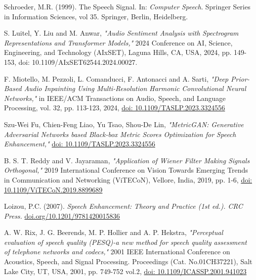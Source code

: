 \begin{thebibliography}{99}

   Schroeder, M.R. (1999). The Speech Signal. In: \textit{Computer Speech}. Springer Series in Information Sciences, vol 35. Springer, Berlin, Heidelberg.

    S. Luitel, Y. Liu and M. Anwar, \textit{"Audio Sentiment Analysis with Spectrogram Representations and Transformer Models,"} 2024 Conference on AI, Science, Engineering, and Technology (AIxSET), Laguna Hills, CA, USA, 2024, pp. 149-153, doi: 10.1109/AIxSET62544.2024.00027.

    F. Miotello, M. Pezzoli, L. Comanducci, F. Antonacci and A. Sarti, \textit{"Deep Prior-Based Audio Inpainting Using Multi-Resolution Harmonic Convolutional Neural Networks,"} in IEEE/ACM Transactions on Audio, Speech, and Language Processing, vol. 32, pp. 113-123, 2024, \href{https://ieeexplore.ieee.org/document/10286406}{doi: 10.1109/TASLP.2023.3324556}

    Szu-Wei Fu, Chien-Feng Liao, Yu Tsao, Shou-De Lin, \textit{"MetricGAN: Generative Adversarial Networks based Black-box Metric Scores Optimization for Speech Enhancement,"} \href{https://arxiv.org/abs/1905.04874}{doi: 10.1109/TASLP.2023.3324556}    
    
    B. S. T. Reddy and V. Jayaraman, \textit{"Application of Wiener Filter Making Signals Orthogonal,"} 2019 International Conference on Vision Towards Emerging Trends in Communication and Networking (ViTECoN), Vellore, India, 2019, pp. 1-6, \href{https://ieeexplore.ieee.org/document/8899689}{doi: 10.1109/ViTECoN.2019.8899689}

    
     Loizou, P.C. (2007). \textit{Speech Enhancement: Theory and Practice (1st ed.). CRC Press.} \href{https://doi.org/10.1201/9781420015836}{doi.org/10.1201/9781420015836}
    

    
    A. W. Rix, J. G. Beerends, M. P. Hollier and A. P. Hekstra, \textit{"Perceptual evaluation of speech quality (PESQ)-a new method for speech quality assessment of telephone networks and codecs,"} 2001 IEEE International Conference on Acoustics, Speech, and Signal Processing. Proceedings (Cat. No.01CH37221), Salt Lake City, UT, USA, 2001, pp. 749-752 vol.2, \href{https://ieeexplore.ieee.org/document/941023}{doi: 10.1109/ICASSP.2001.941023}


\end{thebibliography}
